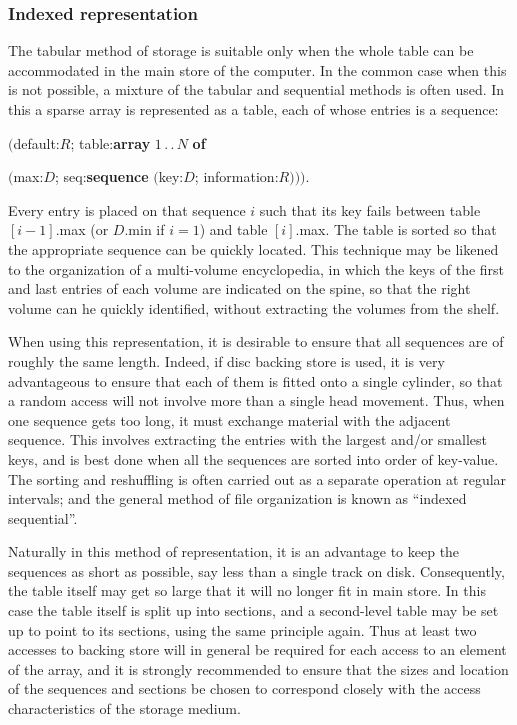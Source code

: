 \subsubsection{Indexed representation}

The tabular method of storage is suitable only when the whole table can be
accommodated in the main store of the computer. In the common case
when this is not possible, a mixture of the tabular and sequential methods is
often used. In this a sparse array is represented as a table, each of whose
entries is a sequence:

\quad $($default:$R$; table:\textbf{array} $1\,.\,.\,N$ \textbf{of}

\tabto*{10em}$($max:$D$; seq:\textbf{sequence} $($key:$D$; information:$R)))$.

\noindent
Every entry is placed on that sequence $i$ such that its key fails between table $[i - 1]$.max (or $D$.min if $i = 1$) and table $[i]$.max. The table is sorted so that the appropriate sequence can be quickly located. This technique may be likened to the organization of a multi-volume encyclopedia, in which the keys of the first and last entries of each volume are indicated on the spine, so that the right volume can he quickly identified, without extracting the volumes from the shelf.

When using this representation, it is desirable to ensure that all sequences are of roughly the same length. Indeed, if disc backing store is used, it is very advantageous to ensure that each of them is fitted onto a single cylinder, so that a random access will not involve more than a single head movement. Thus, when one sequence gets too long, it must exchange material with the adjacent sequence. This involves extracting the entries with the largest and/or smallest keys, and is best done when all the sequences are sorted into order of key-value. The sorting and reshuffling is often carried out as a separate operation at regular intervals; and the general method of file organization is known as ``indexed sequential''.

Naturally in this method of representation, it is an advantage to keep the sequences as short as possible, say less than a single track on disk. Consequently, the table itself may get so large that it will no longer fit in main store. In this case the table itself is split up into sections, and a second-level table may be set up to point to its sections, using the same principle again. Thus at least two accesses to backing store will in general be required for each access to an element of the array, and it is strongly recommended to ensure that the sizes and location of the sequences and sections be chosen to correspond closely with the access characteristics of the storage medium.

